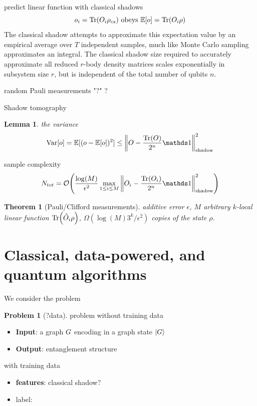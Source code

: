 \documentclass[
10pt,
aps,
pra,
linenumbers,
floatfix,
]{revtex4-2}
\theoremstyle{plain}
\newtheorem{theorem}{Theorem}
\newtheorem{lemma}{Lemma}
\theoremstyle{definition}
\newtheorem{remark}{Remark}
\newtheorem{problem}{Problem}
\newcommand{\shadow}{\text{shadow}}
\newcommand{\ob}{\hat{O}}
\newcommand{\dm}{\rho}
\begin{document}
predict linear function with classical shadows
\begin{equation}
	o_i = \Tr(O_i \dm_{cs})
	\text{ obeys }
	\expectation[o] =\Tr(O_i \dm)
\end{equation}
The classical shadow attempts to approximate this expectation value by an empirical average over $T$ independent samples, much like Monte Carlo sampling approximates an integral.
The classical shadow size required to accurately approximate all reduced $r$-body density matrices scales exponentially in subsystem size $r$, but is independent of the total number of qubits $n$.

\begin{algorithm}[H]
    \DontPrintSemicolon
    \Input{density matrix $\dm$, ..}
    \BlankLine
     {
        random Pauli measurements 
    {\Return "?"}
    }
    \Return ?
    \caption{Shadow tomography}
    \label{alg:classical_shadow}
\end{algorithm}
\begin{lemma}
	the variance
	\begin{equation}
		\variance[o] = \expectation[(o-\expectation[o])^2]
		\le \norm{O - \frac{\Tr(O)}{2^n} \identity}^2_{\shadow}
	\end{equation}
\end{lemma}
sample complexity
\begin{equation}
	N_{tot} = \bigO \qty(
		\frac{\log (M)}{\epsilon^2} \max_{1\le i\le M} 
		\norm{O_i - \frac{\Tr(O_i)}{2^n} \identity}^2_{\shadow}
	)
\end{equation}
\begin{theorem}[Pauli/Clifford measurements]
	additive error $\epsilon$, $M$ arbitrary $k$-local linear function $\Tr(\ob_i\dm)$,
	$\Omega(\log(M) 3^k/\epsilon^2)$ copies of the state $\dm$.
\end{theorem}

\section{Classical, data-powered, and quantum algorithms}
We consider the problem 
\begin{problem}[?data]
	problem without training data
	\begin{itemize}
		\item \textbf{Input}: a graph $G$ encoding in a graph state $\ket{G}$
		\item \textbf{Output}: entanglement structure
	\end{itemize}
	with training data
	\begin{itemize}
		\item \textbf{features}: classical shadow?
		\item label: 
	\end{itemize}
\end{problem}
\end{document}
